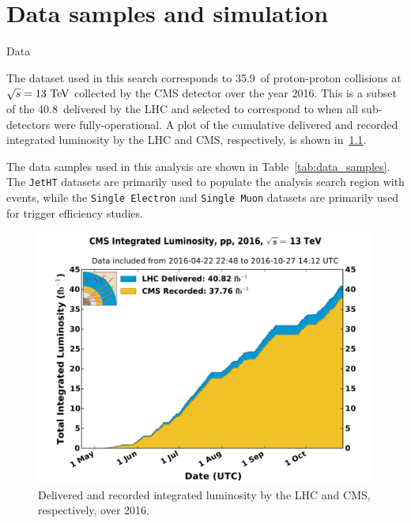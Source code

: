 \chapter{Data samples and simulation}
\begin{section}{Data}

The dataset used in this search corresponds to 35.9~\ifb of proton-proton collisions at $\sqrt{s} = 13~\mathrm{Te\kern -0.1em V}$ collected by the CMS detector over the year 2016.
This is a subset of the 40.8~\ifb delivered by the LHC and selected to correspond to when all sub-detectors were fully-operational.
A plot of the cumulative delivered and recorded integrated luminosity by the LHC and CMS, respectively, is shown in~\ref{fig:lumi_2016}. 

The data samples used in this analysis are shown in Table~\ref{tab:data_samples}.
The \texttt{JetHT} datasets are primarily used to populate the analysis search region with events, while the \texttt{Single Electron} and \texttt{Single Muon} datasets are primarily used for trigger efficiency studies.

\begin{figure}[tbp!]
\begin{center}
\includegraphics[angle=0,width=0.80\columnwidth]{fig/lumi_2016.pdf}
\end{center}
\caption{Delivered and recorded integrated luminosity by the LHC and CMS, respectively, over 2016.~\cite{lumi_2016}}
\label{fig:lumi_2016}
\end{figure}


\end{section}
